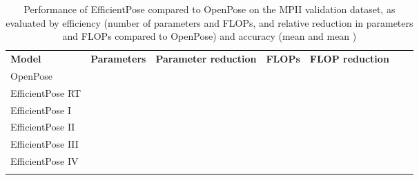 \begin{table*}
\centering
\caption{Performance of EfficientPose compared to OpenPose on the MPII validation dataset, as evaluated by efficiency (number of parameters and FLOPs, and relative reduction in parameters and FLOPs compared to OpenPose) and accuracy (mean  and mean )}
\label{tab:mpiival}       
\begin{tabular}{lllllll}
\hline\noalign{\smallskip}
\textbf{Model} & \textbf{Parameters} & \textbf{Parameter reduction} & \textbf{FLOPs} & \textbf{FLOP reduction} &  &   \\
\noalign{\smallskip}\hline\noalign{\smallskip}
OpenPose~\cite{cao2018openpose} &  &	 &  &  & 	&  \\
EfficientPose RT &  &  &  &  &  &  \\
EfficientPose I	&  &  &  &  &  &  \\
EfficientPose II &  &  &  &  &  &  \\
EfficientPose III &  &  &  &  &  &  \\
EfficientPose IV &  &  &  &  &  &  \\
\noalign{\smallskip}\hline
\end{tabular}
\end{table*}

